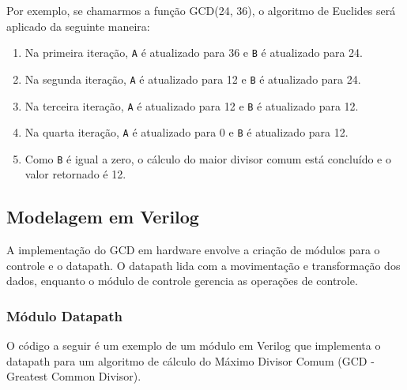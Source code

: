 \documentclass[a4paper,11pt]{article} %
\begin{document}
Por exemplo, se chamarmos a função GCD(24, 36), o algoritmo de Euclides será aplicado da seguinte maneira:

\begin{enumerate}
    \item Na primeira iteração, \texttt{A} é atualizado para 36 e \texttt{B} é atualizado para 24.
    \item Na segunda iteração, \texttt{A} é atualizado para 12 e \texttt{B} é atualizado para 24.
    \item Na terceira iteração, \texttt{A} é atualizado para 12 e \texttt{B} é atualizado para 12.
    \item Na quarta iteração, \texttt{A} é atualizado para 0 e \texttt{B} é atualizado para 12.
    \item Como \texttt{B} é igual a zero, o cálculo do maior divisor comum está concluído e o valor retornado é 12.
\end{enumerate}

\subsection{Modelagem em Verilog}

A implementação do GCD em hardware envolve a 
criação de módulos para o controle e o datapath. 
O datapath lida com a movimentação e transformação dos dados, 
enquanto o módulo de controle gerencia as operações de controle.

\subsubsection{Módulo Datapath}

O código a seguir é um exemplo de um módulo em Verilog 
que implementa o datapath para um algoritmo de cálculo do 
Máximo Divisor Comum (GCD - Greatest Common Divisor). 
\end{document}
